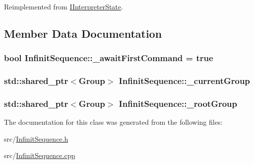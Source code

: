 Reimplemented from \hyperlink{class_i_interpreter_state_a4a8559db87100cc214e544d274ee4174}{I\+Interpreter\+State}.



\subsection{Member Data Documentation}
\subsubsection[{\texorpdfstring{\+\_\+await\+First\+Command}{_awaitFirstCommand}}]{\setlength{\rightskip}{0pt plus 5cm}bool Infinit\+Sequence\+::\+\_\+await\+First\+Command = true\hspace{0.3cm}{\ttfamily [protected]}}\hypertarget{class_infinit_sequence_ae10e9c4c746b3b7bc01c1d196bc05aa2}{}\label{class_infinit_sequence_ae10e9c4c746b3b7bc01c1d196bc05aa2}
\subsubsection[{\texorpdfstring{\+\_\+current\+Group}{_currentGroup}}]{\setlength{\rightskip}{0pt plus 5cm}std\+::shared\+\_\+ptr$<${\bf Group}$>$ Infinit\+Sequence\+::\+\_\+current\+Group\hspace{0.3cm}{\ttfamily [protected]}}\hypertarget{class_infinit_sequence_afd8d7da621ed72083b00d75297b7f992}{}\label{class_infinit_sequence_afd8d7da621ed72083b00d75297b7f992}
\subsubsection[{\texorpdfstring{\+\_\+root\+Group}{_rootGroup}}]{\setlength{\rightskip}{0pt plus 5cm}std\+::shared\+\_\+ptr$<${\bf Group}$>$ Infinit\+Sequence\+::\+\_\+root\+Group\hspace{0.3cm}{\ttfamily [protected]}}\hypertarget{class_infinit_sequence_ababeabf069e6bd4d53be04d2962fe990}{}\label{class_infinit_sequence_ababeabf069e6bd4d53be04d2962fe990}


The documentation for this class was generated from the following files\+:\begin{DoxyCompactItemize}
\item 
src/\hyperlink{_infinit_sequence_8h}{Infinit\+Sequence.\+h}\item 
src/\hyperlink{_infinit_sequence_8cpp}{Infinit\+Sequence.\+cpp}\end{DoxyCompactItemize}

